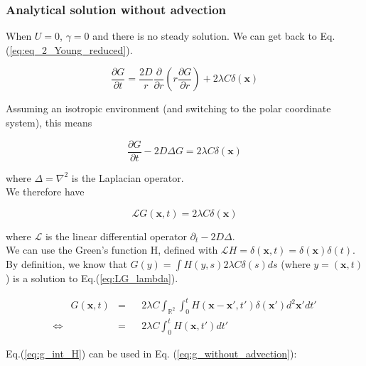 \subsubsection*{Analytical solution without advection}

When $U=0$, $\gamma=0$ and there is no steady solution. We can get
back to Eq. (\ref{eq:eq_2_Young_reduced}). 

\begin{equation}
\frac{\partial G}{\partial t}=\frac{2D}{r}\frac{\partial}{\partial r}\left(r\frac{\partial G}{\partial r}\right)+2\lambda C\delta(\boldsymbol{x})\label{eq:g_without_advection}
\end{equation}

Assuming an isotropic environment (and switching to the polar coordinate system), this means

\begin{equation}
\frac{\partial G}{\partial t}-2D\Delta G=2\lambda C\delta(\boldsymbol{x})
\end{equation}

where $\Delta=\nabla^{2}$ is the Laplacian operator. \\

We therefore have 

\begin{equation}
\mathcal{L}G(\boldsymbol{x},t)=2\lambda C\delta(\boldsymbol{x})\label{eq:LG_lambda}
\end{equation}

where $\mathcal{L}$ is the linear differential operator $\partial_{t}-2D\Delta$. \\

We can use the Green's function H, defined with $\mathcal{L}H=\delta(\boldsymbol{x},t)=\delta(\boldsymbol{x})\delta(t)$. \\

By definition, we know that $G(y)=\int H(y,s)2\lambda C\delta(s)ds$
(where $y=(\boldsymbol{x},t)$) is a solution to Eq.(\ref{eq:LG_lambda}).

\begin{align}
 & G(\boldsymbol{x},t) & = & & 2\lambda C\int_{\mathbb{R}^{2}}\int_{0}^{t}H(\boldsymbol{x}-\boldsymbol{x}',t')\delta(\boldsymbol{x}')d^2\boldsymbol{x}'dt'\nonumber \\
\Leftrightarrow &  & = &  & 2\lambda C\int_{0}^{t}H(\boldsymbol{x},t')dt'\label{eq:g_int_H}
\end{align}

Eq.(\ref{eq:g_int_H}) can be used in Eq. (\ref{eq:g_without_advection}):

